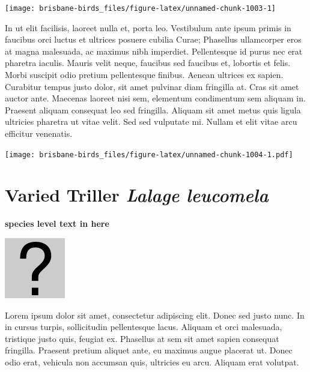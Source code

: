 \documentclass[]{book}
\let\origfigure\figure
\let\endorigfigure\endfigure
\renewenvironment{figure}[1][2] {
  \expandafter\origfigure\expandafter[H]
} {
  \endorigfigure
}
\begin{document}
\begin{figure}
\texttt{[image: brisbane-birds\_files/figure-latex/unnamed-chunk-1003-1]} \caption{insert figure caption}\label{fig:unnamed-chunk-1003}
\end{figure}

In ut elit facilisis, laoreet nulla et, porta leo. Vestibulum ante ipsum
primis in faucibus orci luctus et ultrices posuere cubilia Curae;
Phasellus ullamcorper eros at magna malesuada, ac maximus nibh
imperdiet. Pellentesque id purus nec erat pharetra iaculis. Mauris velit
neque, faucibus sed faucibus et, lobortis et felis. Morbi suscipit odio
pretium pellentesque finibus. Aenean ultrices ex sapien. Curabitur
tempus justo dolor, sit amet pulvinar diam fringilla at. Cras sit amet
auctor ante. Maecenas laoreet nisi sem, elementum condimentum sem
aliquam in. Praesent aliquam consequat leo sed fringilla. Aliquam sit
amet metus quis ligula ultricies pharetra ut vitae velit. Sed sed
vulputate mi. Nullam et elit vitae arcu efficitur venenatis.

\begin{figure}
\centering
\texttt{[image: brisbane-birds\_files/figure-latex/unnamed-chunk-1004-1.pdf]}
\caption{\label{fig:unnamed-chunk-1004}insert figure caption}
\end{figure}

\section{\texorpdfstring{Varied Triller \emph{Lalage
leucomela}}{Varied Triller Lalage leucomela}}\label{varied-triller-lalage-leucomela}

\textbf{species level text in here}

\begin{figure}
\centering
\includegraphics{assets/missing.png}
\caption{No image for species}
\end{figure}

Lorem ipsum dolor sit amet, consectetur adipiscing elit. Donec sed justo
nunc. In in cursus turpis, sollicitudin pellentesque lacus. Aliquam et
orci malesuada, tristique justo quis, feugiat ex. Phasellus at sem sit
amet sapien consequat fringilla. Praesent pretium aliquet ante, eu
maximus augue placerat ut. Donec odio erat, vehicula non accumsan quis,
ultricies eu arcu. Aliquam erat volutpat.
\end{document}
